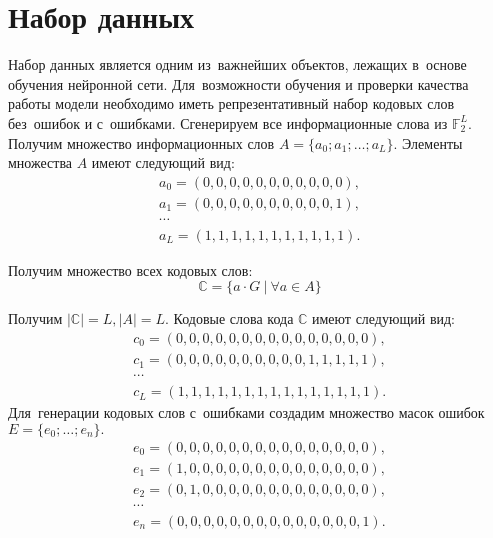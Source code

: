 \section{Набор данных}

Набор данных является одним из~важнейших объектов, лежащих в~основе обучения нейронной сети\cite[с.\,23]{bib:neural_networks}. Для~возможности обучения и проверки качества работы модели необходимо иметь репрезентативный\cite{bib:representative_data_sets} набор кодовых слов без~ошибок и с~ошибками.
Сгенерируем все информационные слова из $\mathbb{F}_2^L$. Получим множество информационных слов $A = \{a_0; a_1; \dots; a_{L}\}$. Элементы множества $A$ имеют следующий вид:
\begin{gather}
  \nonumber a_0 = (0, 0, 0, 0, 0, 0, 0, 0, 0, 0, 0), \\
  \nonumber a_1 = (0, 0, 0, 0, 0, 0, 0, 0, 0, 0, 1), \\
  \nonumber \cdots \\
  \nonumber a_L = (1, 1, 1, 1, 1, 1, 1, 1, 1, 1, 1).
\end{gather}

Получим множество всех кодовых слов:
\begin{equation*}
  \mathbb{C} = \{a\cdot G~|~\forall a \in A \}
\end{equation*}

Получим $|\mathbb{C}| = L, |A| = L$. Кодовые слова кода $\mathbb{C}$ имеют следующий вид:
\begin{gather}
    \nonumber c_0 = (0, 0, 0, 0, 0, 0, 0, 0, 0, 0, 0, 0, 0, 0, 0), \\
    \nonumber c_1 = (0, 0, 0, 0, 0, 0, 0, 0, 0, 0, 1, 1, 1, 1, 1), \\
    \nonumber \cdots \\
    \nonumber c_L = (1, 1, 1, 1, 1, 1, 1, 1, 1, 1, 1, 1, 1, 1, 1).
\end{gather}
\newpage
Для~генерации кодовых слов с~ошибками создадим множество масок ошибок $E = \{e_0; \dots; e_n\}.$
\begin{gather}
    \nonumber e_0 = (0, 0, 0, 0, 0, 0, 0, 0, 0, 0, 0, 0, 0, 0, 0), \\
    \nonumber e_1 = (1, 0, 0, 0, 0, 0, 0, 0, 0, 0, 0, 0, 0, 0, 0), \\
    \nonumber e_2 = (0, 1, 0, 0, 0, 0, 0, 0, 0, 0, 0, 0, 0, 0, 0), \\
    \nonumber \cdots                                                \\
    \nonumber e_n = (0, 0, 0, 0, 0, 0, 0, 0, 0, 0, 0, 0, 0, 0, 1).
\end{gather}

